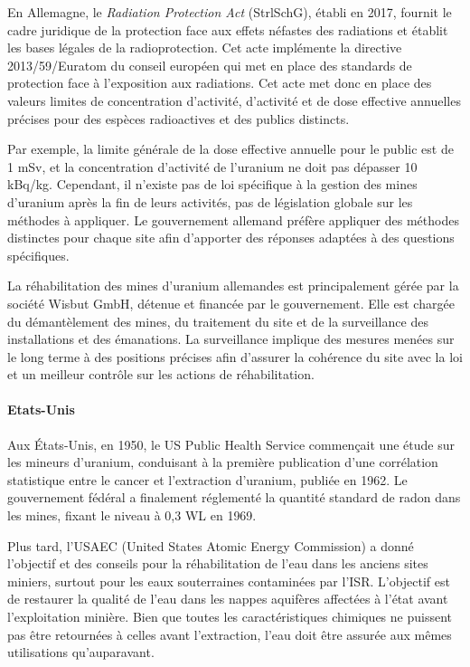 \documentclass{article}
\begin{document}
En Allemagne, le \emph{Radiation Protection Act} (StrlSchG), établi en 2017, fournit le cadre juridique de la protection face aux effets néfastes des radiations et établit les bases légales de la radioprotection. Cet acte implémente la directive 2013/59/Euratom du conseil européen qui met en place des standards de protection face à l’exposition aux radiations. Cet acte met donc en place des valeurs limites de concentration d’activité, d’activité et de dose effective annuelles précises pour des espèces radioactives et des publics distincts. 


Par exemple, la limite générale de la dose effective annuelle pour le public est de 1 mSv, et la concentration d’activité de l’uranium ne doit pas dépasser 10 kBq/kg. Cependant, il n’existe pas de loi spécifique à la gestion des mines d’uranium après la fin de leurs activités, pas de législation globale sur les méthodes à appliquer. Le gouvernement allemand préfère appliquer des méthodes distinctes pour chaque site afin d’apporter des réponses adaptées à des questions spécifiques.

La réhabilitation des mines d’uranium allemandes est principalement gérée par la société Wisbut GmbH, détenue et financée par le gouvernement. Elle est chargée du démantèlement des mines, du traitement du site et de la surveillance des installations et des émanations. La surveillance implique des mesures menées sur le long terme à des positions précises afin d’assurer la cohérence du site avec la loi et un meilleur contrôle sur les actions de réhabilitation.

\paragraph{Etats-Unis}

Aux États-Unis, en 1950, le US Public Health Service commençait une étude sur les mineurs d'uranium, conduisant à la première publication d'une corrélation statistique entre le cancer et l'extraction d'uranium, publiée en 1962. Le gouvernement fédéral a finalement réglementé la quantité standard de radon dans les mines, fixant le niveau à 0,3 WL en 1969. 

Plus tard, l'USAEC (United States Atomic Energy Commission) a donné l’objectif et des conseils pour la réhabilitation de l’eau dans les anciens sites miniers, surtout pour les eaux souterraines contaminées par l'ISR. L’objectif est de restaurer la qualité de l'eau dans les nappes aquifères affectées à l’état avant l'exploitation minière. Bien que toutes les caractéristiques chimiques ne puissent pas être retournées à celles avant l'extraction, l'eau doit être assurée aux mêmes utilisations qu'auparavant. 
\end{document}
